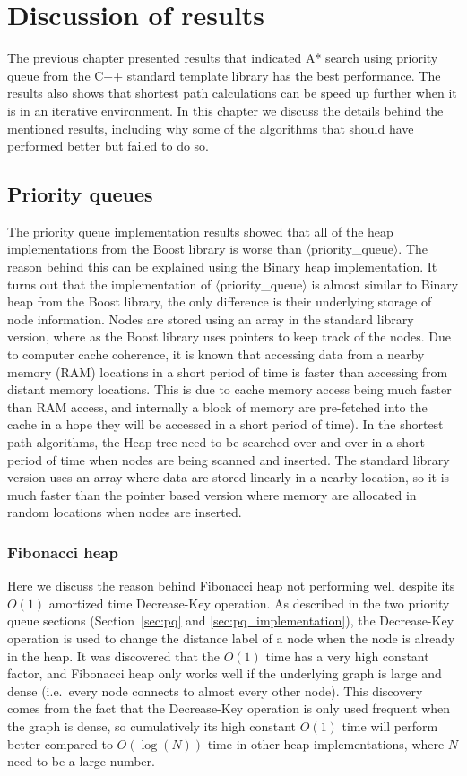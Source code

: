 \chapter{Discussion of results}
The previous chapter presented results that indicated A* search using priority queue from the C++ standard template library has the best performance.
The results also shows that shortest path calculations can be speed up further when it is in an iterative environment.
In this chapter we discuss the details behind the mentioned results,
including why some of the algorithms that should have performed better but failed to do so.

\section{Priority queues}
The priority queue implementation results showed that
all of the heap implementations from the Boost library is worse than $\langle$priority\_queue$\rangle$.
The reason behind this can be explained using the Binary heap implementation.
It turns out that the implementation of $\langle$priority\_queue$\rangle$ is almost similar to Binary heap from the Boost library,
the only difference is their underlying storage of node information.
Nodes are stored using an array in the standard library version,
where as the Boost library uses pointers to keep track of 
the nodes.
Due to computer cache coherence,
it is known that accessing data from a nearby memory (RAM) locations in a short period of time is faster than accessing from distant memory locations.
This is due to cache memory access being much faster than RAM access,
and internally a block of memory are pre-fetched into the cache in a hope they will be accessed in a short period of time).
In the shortest path algorithms,
the Heap tree need to be searched over and over in a short period of time when nodes are being scanned and inserted.
The standard library version uses an array where data are stored linearly in a nearby location,
so it is much faster than the pointer based version where memory are allocated in random locations when nodes are inserted.

\subsection{Fibonacci heap}
Here we discuss the reason behind Fibonacci heap not performing well despite its $O(1)$ amortized time Decrease-Key operation.
As described in the two priority queue sections (Section~\ref{sec:pq} and \ref{sec:pq_implementation}),
the Decrease-Key operation is used to change the distance label of a node when the node is already in the heap.
It was discovered that the $O(1)$ time has a very high constant factor,
and Fibonacci heap only works well if the underlying graph is large and dense (i.e.\ every node connects to almost every other node).
This discovery comes from the fact that 
the Decrease-Key operation is only used frequent when the graph is dense,
so cumulatively its high constant $O(1)$ time will perform better compared to $O(\log(N))$ time in other heap implementations, where $N$ need to be a large number.

